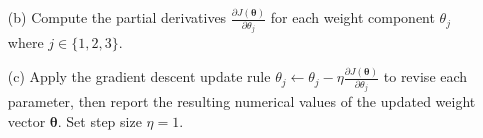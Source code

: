 \documentclass[11pt,addpoints,answers]{exam}
\newcommand{\thetav}{\boldsymbol{\theta}}
\begin{document}
\begin{enumerate}
\begin{enumerate}[label=\alph*), itemsep=10pt]
			\begin{your_solution}[title=$J(\thetav)$,height=2cm,width=3cm]
			\end{your_solution}
			
			\begin{your_solution}[title=Work,height=6cm]
			\end{your_solution}
			
			\pagebreak
			
			\item[(b)] Compute the partial derivatives $\frac{\partial J(\thetav)}{\partial \theta_j}$ for each weight component $\theta_{j}$ where $j \in \{1, 2, 3\}$.
			
			\begin{your_solution}[title=$\partial J(\thetav)/\partial \theta_1$,height=1.8cm,width=5.2cm]
			\end{your_solution}
			\begin{your_solution}[title=$\partial J(\thetav)/\partial \theta_2$,height=1.8cm,width=5.2cm]
			\end{your_solution}
			\begin{your_solution}[title=$\partial J(\thetav)/\partial \theta_3$,height=1.8cm,width=5.2cm]
			\end{your_solution}
			
			\begin{your_solution}[title=Work,height=18cm]
			\end{your_solution}
			
			
			\clearpage
			
			\item[(c)] Apply the gradient descent update rule $\theta_j \leftarrow \theta_j - \eta \frac{\partial J(\thetav)}{\partial \theta_j}$ to revise each parameter, then report the resulting numerical values of the updated weight vector $\thetav$. Set step size $\eta = 1$.
			
			\begin{your_solution}[title=$\theta_1$,height=1.8cm,width=5.2cm]
			\end{your_solution}
			\begin{your_solution}[title=$\theta_2$,height=1.8cm,width=5.2cm]
			\end{your_solution}
			\begin{your_solution}[title=$\theta_3$,height=1.8cm,width=5.2cm]
			\end{your_solution}
			

\end{enumerate}
\end{enumerate}
\end{document}
